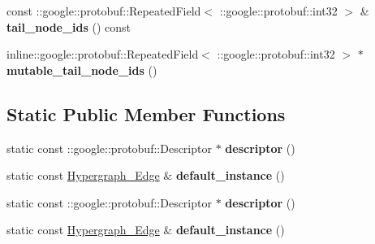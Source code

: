 \begin{DoxyCompactItemize}
\item 
\hypertarget{classHypergraph__Edge_ab2aed597bf14531310d8b8a7383d54cb}{
const ::google::protobuf::RepeatedField$<$ ::google::protobuf::int32 $>$ \& {\bfseries tail\_\-node\_\-ids} () const }
\label{classHypergraph__Edge_ab2aed597bf14531310d8b8a7383d54cb}

\item 
\hypertarget{classHypergraph__Edge_a561c8d91a2f2456595236252a966cf54}{
inline::google::protobuf::RepeatedField$<$ ::google::protobuf::int32 $>$ $\ast$ {\bfseries mutable\_\-tail\_\-node\_\-ids} ()}
\label{classHypergraph__Edge_a561c8d91a2f2456595236252a966cf54}

\end{DoxyCompactItemize}
\subsection*{Static Public Member Functions}
\begin{DoxyCompactItemize}
\item 
\hypertarget{classHypergraph__Edge_a4f7ad83705462267c157231c62ca4e9e}{
static const ::google::protobuf::Descriptor $\ast$ {\bfseries descriptor} ()}
\label{classHypergraph__Edge_a4f7ad83705462267c157231c62ca4e9e}

\item 
\hypertarget{classHypergraph__Edge_af42a82988e991869b1b6e7831eeea7a8}{
static const \hyperlink{classHypergraph__Edge}{Hypergraph\_\-Edge} \& {\bfseries default\_\-instance} ()}
\label{classHypergraph__Edge_af42a82988e991869b1b6e7831eeea7a8}

\item 
\hypertarget{classHypergraph__Edge_a4f7ad83705462267c157231c62ca4e9e}{
static const ::google::protobuf::Descriptor $\ast$ {\bfseries descriptor} ()}
\label{classHypergraph__Edge_a4f7ad83705462267c157231c62ca4e9e}

\item 
\hypertarget{classHypergraph__Edge_af42a82988e991869b1b6e7831eeea7a8}{
static const \hyperlink{classHypergraph__Edge}{Hypergraph\_\-Edge} \& {\bfseries default\_\-instance} ()}
\label{classHypergraph__Edge_af42a82988e991869b1b6e7831eeea7a8}

\end{DoxyCompactItemize}
